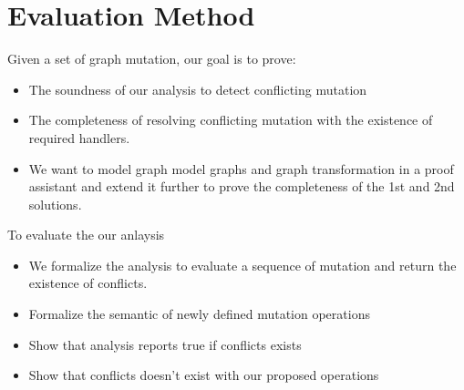 \section{Evaluation Method}
\begin{frame}
Given a set of graph mutation, our goal is to prove:
  	\begin{itemize}
		 \item The soundness of our analysis to detect conflicting mutation
		 \item The completeness of resolving conflicting mutation with the
		 existence of required handlers.
		 \item We want to model graph model graphs and graph transformation in a proof assistant and extend it further to prove the completeness of the 1st and 2nd solutions.
	          \end{itemize}	         
\end{frame}

\begin{frame}
 To evaluate the our anlaysis\linebreak
\begin{itemize}
  \item We formalize the analysis to evaluate a sequence of mutation and return
  the existence of conflicts.
\item Formalize the semantic of newly defined mutation operations
\item Show that analysis reports true if conflicts exists
\item Show that conflicts doesn't exist with our proposed operations
\end{itemize}

\end{frame}

 